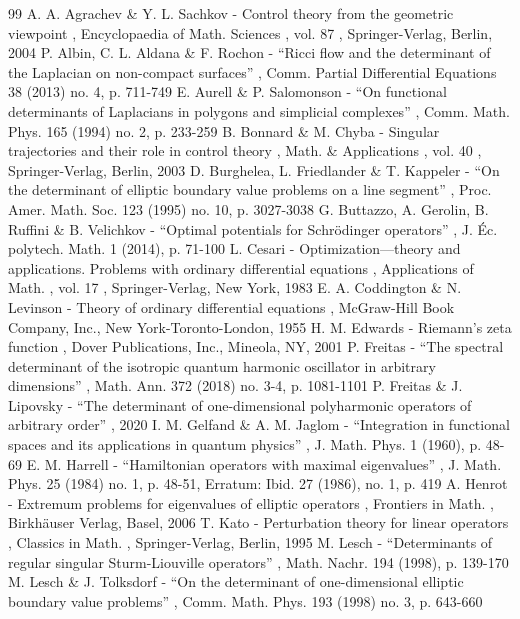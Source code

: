\documentclass[10pt,a4paper]{amsart}
\theoremstyle{plain}
\theoremstyle{definition}
\begin{document}
\begin{thebibliography}{99}
 A. A. Agrachev \& Y. L. Sachkov - Control theory from the geometric viewpoint , Encyclopaedia of Math. Sciences , vol. 87 , Springer-Verlag, Berlin, 2004
 P. Albin, C. L. Aldana \& F. Rochon - “Ricci flow and the determinant of the Laplacian on non-compact surfaces” , Comm. Partial Differential Equations 38 (2013) no. 4, p. 711-749
 E. Aurell \& P. Salomonson - “On functional determinants of Laplacians in polygons and simplicial complexes” , Comm. Math. Phys. 165 (1994) no. 2, p. 233-259
 B. Bonnard \& M. Chyba - Singular trajectories and their role in control theory , Math. \& Applications , vol. 40 , Springer-Verlag, Berlin, 2003
 D. Burghelea, L. Friedlander \& T. Kappeler - “On the determinant of elliptic boundary value problems on a line segment” , Proc. Amer. Math. Soc. 123 (1995) no. 10, p. 3027-3038
 G. Buttazzo, A. Gerolin, B. Ruffini \& B. Velichkov - “Optimal potentials for Schrödinger operators” , J. Éc. polytech. Math. 1 (2014), p. 71-100
 L. Cesari - Optimization—theory and applications. Problems with ordinary differential equations , Applications of Math. , vol. 17 , Springer-Verlag, New York, 1983
 E. A. Coddington \& N. Levinson - Theory of ordinary differential equations , McGraw-Hill Book Company, Inc., New York-Toronto-London, 1955
 H. M. Edwards - Riemann’s zeta function , Dover Publications, Inc., Mineola, NY, 2001
 P. Freitas - “The spectral determinant of the isotropic quantum harmonic oscillator in arbitrary dimensions” , Math. Ann. 372 (2018) no. 3-4, p. 1081-1101
 P. Freitas \& J. Lipovsky - “The determinant of one-dimensional polyharmonic operators of arbitrary order” , 2020
 I. M. Gelfand \& A. M. Jaglom - “Integration in functional spaces and its applications in quantum physics” , J. Math. Phys. 1 (1960), p. 48-69
 E. M. Harrell - “Hamiltonian operators with maximal eigenvalues” , J. Math. Phys. 25 (1984) no. 1, p. 48-51, Erratum: Ibid. 27 (1986), no. 1, p. 419
 A. Henrot - Extremum problems for eigenvalues of elliptic operators , Frontiers in Math. , Birkhäuser Verlag, Basel, 2006
 T. Kato - Perturbation theory for linear operators , Classics in Math. , Springer-Verlag, Berlin, 1995
 M. Lesch - “Determinants of regular singular Sturm-Liouville operators” , Math. Nachr. 194 (1998), p. 139-170
 M. Lesch \& J. Tolksdorf - “On the determinant of one-dimensional elliptic boundary value problems” , Comm. Math. Phys. 193 (1998) no. 3, p. 643-660

\end{thebibliography}
\end{document}
